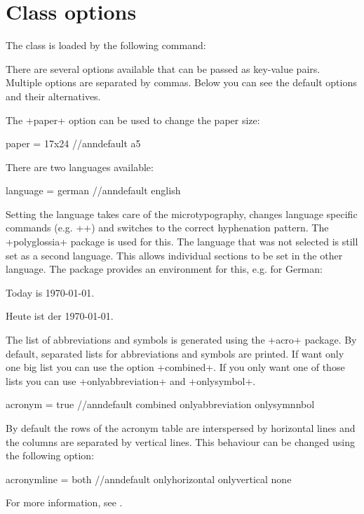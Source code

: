 \documentclass[
  paper = 17x24, %
  language = english, %
  acronym = true, %
  bibliography = true, %
  acronymline = onlyhorizontal, %
]{faupress}
\begin{document}
\chapter{Class options}

The class is loaded by the following command:
There are several options available that can be passed as key-value pairs. Multiple
options are separated by commas. Below you can see the default options and their alternatives.

The \code+paper+ option can be used to change the paper size:
\begin{codebox}
  paper = 17x24 //ann{default}
          a5
\end{codebox}
There are two languages available:
\begin{codebox}
  language = german //ann{default}
             english
\end{codebox}
Setting the language takes care of the microtypography, changes language specific
commands (e.g. \code+\tableofcontents+) and  switches to the correct hyphenation
pattern. The \code+polyglossia+ package is used for this. The language that was not
selected is still set as a second language. This allows individual sections to be set in
the other language. The package provides an environment for this, e.g. for German:
\begin{codeexamplebox}
  Today is \today.
  \begin{german}
    Heute ist der \today.
  \end{german}
\end{codeexamplebox}

The list of abbreviations and symbols is generated using the \code+acro+ package. By
default, separated lists for abbreviations and symbols are printed. If want only one big
list you can use the option \code+combined+. If you only want one of those lists you can
use \code+onlyabbreviation+ and \code+onlysymbol+.
\begin{codebox}
  acronym = true //ann{default}
            combined
            onlyabbreviation
            onlysymnnbol
\end{codebox}
By default the rows of the acronym table are interspersed by horizontal lines
and the columns are separated by vertical lines. This behaviour can be changed
using the following option:
\begin{codebox}
  acronymline = both //ann{default}
                onlyhorizontal
                onlyvertical
                none
\end{codebox}
For more information, see .
          
\end{document}
